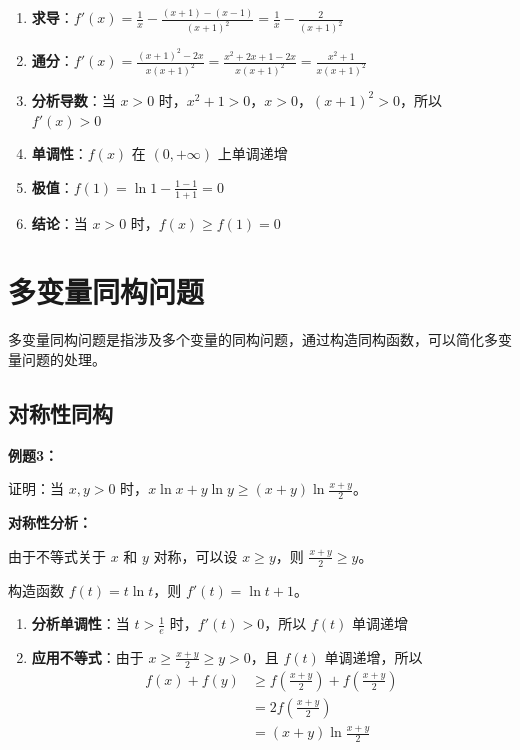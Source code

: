 \documentclass[a4paper,11pt]{ctexrep}
\newcommand{\exampleicon}{\ModeBadge[highlight]{例题}}
\newcommand{\analysisicon}{\ModeBadge[secondary]{分析}}
\theoremstyle{definition}
\begin{document}
\begin{enumerate}
    \item \textbf{求导}：$f'(x) = \frac{1}{x} - \frac{(x+1) - (x-1)}{(x+1)^2} = \frac{1}{x} - \frac{2}{(x+1)^2}$
    \item \textbf{通分}：$f'(x) = \frac{(x+1)^2 - 2x}{x(x+1)^2} = \frac{x^2 + 2x + 1 - 2x}{x(x+1)^2} = \frac{x^2 + 1}{x(x+1)^2}$
    \item \textbf{分析导数}：当 $x > 0$ 时，$x^2 + 1 > 0$，$x > 0$，$(x+1)^2 > 0$，所以 $f'(x) > 0$
    \item \textbf{单调性}：$f(x)$ 在 $(0, +\infty)$ 上单调递增
    \item \textbf{极值}：$f(1) = \ln 1 - \frac{1-1}{1+1} = 0$
    \item \textbf{结论}：当 $x > 0$ 时，$f(x) \geq f(1) = 0$
\end{enumerate}

\section{多变量同构问题}

多变量同构问题是指涉及多个变量的同构问题，通过构造同构函数，可以简化多变量问题的处理。

\subsection{对称性同构}

\exampleicon \textbf{例题3：}

证明：当 $x, y > 0$ 时，$x\ln x + y\ln y \geq (x+y)\ln\frac{x+y}{2}$。

\analysisicon \textbf{对称性分析：}

由于不等式关于 $x$ 和 $y$ 对称，可以设 $x \geq y$，则 $\frac{x+y}{2} \geq y$。

构造函数 $f(t) = t\ln t$，则 $f'(t) = \ln t + 1$。

\begin{enumerate}
    \item \textbf{分析单调性}：当 $t > \frac{1}{e}$ 时，$f'(t) > 0$，所以 $f(t)$ 单调递增
    \item \textbf{应用不等式}：由于 $x \geq \frac{x+y}{2} \geq y > 0$，且 $f(t)$ 单调递增，所以
    \begin{align}
    f(x) + f(y) &\geq f\left(\frac{x+y}{2}\right) + f\left(\frac{x+y}{2}\right) \\
    &= 2f\left(\frac{x+y}{2}\right) \\
    &= (x+y)\ln\frac{x+y}{2}
    \end{align}
\end{enumerate}
\end{document}
